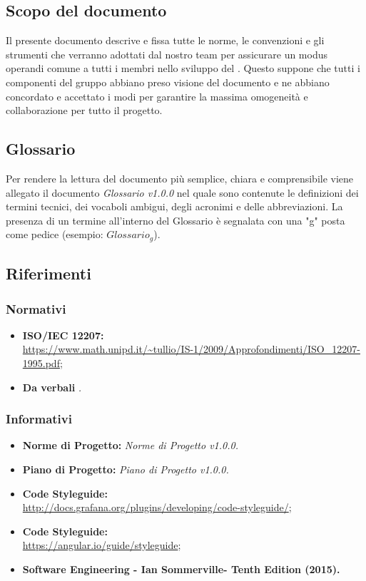 \subsection{Scopo del documento}
Il presente documento descrive e fissa tutte le norme, le convenzioni e gli strumenti che verranno adottati dal nostro team per assicurare un modus operandi comune a tutti i membri nello sviluppo del . Questo suppone che tutti i componenti del gruppo abbiano preso visione del documento e ne abbiano concordato e accettato i modi per garantire la massima omogeneità e collaborazione per tutto il progetto. 
\subsection{Glossario}
Per rendere la lettura del documento più semplice, chiara e comprensibile viene allegato il documento \emph{Glossario v1.0.0} nel quale sono contenute le definizioni dei termini tecnici, dei vocaboli ambigui, degli acronimi e delle abbreviazioni. La presenza di un termine all'interno del Glossario è segnalata con una "g" posta come pedice (esempio: $Glossario_{g}$).  
\subsection{Riferimenti}
\subsubsection{Normativi}
\begin{itemize}
	\item \textbf{ISO/IEC 12207:}\\ \url{https://www.math.unipd.it/~tullio/IS-1/2009/Approfondimenti/ISO_12207-1995.pdf};
	\item \textbf{Da verbali} \emph{.}
\end{itemize}
\subsubsection{Informativi}
\begin{itemize}
	\item \textbf{Norme di Progetto:} \emph{Norme di Progetto v1.0.0.}
	\item \textbf{Piano di Progetto:} \emph{Piano di Progetto v1.0.0.}
	\item \textbf{ Code Styleguide:} \\
	\url{http://docs.grafana.org/plugins/developing/code-styleguide/};
	\item \textbf{ Code Styleguide:} \\
	\url{https://angular.io/guide/styleguide};
	\item \textbf{Software Engineering - Ian Sommerville- Tenth Edition (2015).}
\end{itemize}
\pagebreak